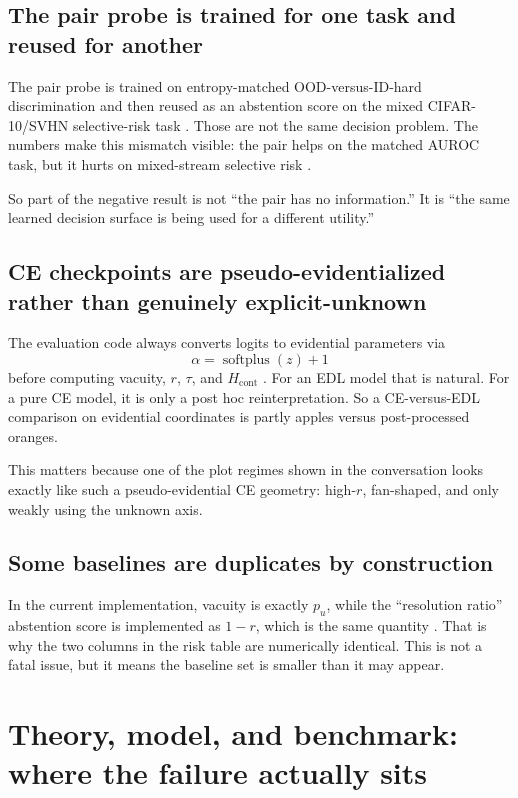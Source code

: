 \documentclass[11pt]{article}
\begin{document}
\subsection{The pair probe is trained for one task and reused for another}

The pair probe is trained on entropy-matched OOD-versus-ID-hard discrimination and then reused as an abstention score on the mixed CIFAR-10/SVHN selective-risk task \cite{eval}. Those are not the same decision problem. The numbers make this mismatch visible: the pair helps on the matched AUROC task, but it hurts on mixed-stream selective risk \cite{csv-auroc,csv-risk}.

So part of the negative result is not ``the pair has no information.'' It is ``the same learned decision surface is being used for a different utility.''

\subsection{CE checkpoints are pseudo-evidentialized rather than genuinely explicit-unknown}

The evaluation code always converts logits to evidential parameters via
\[
\alpha = \operatorname{softplus}(z)+1
\]
before computing vacuity, $r$, $\tau$, and $H_{\mathrm{cont}}$ \cite{eval}. For an EDL model that is natural. For a pure CE model, it is only a post hoc reinterpretation. So a CE-versus-EDL comparison on evidential coordinates is partly apples versus post-processed oranges.

This matters because one of the plot regimes shown in the conversation looks exactly like such a pseudo-evidential CE geometry: high-$r$, fan-shaped, and only weakly using the unknown axis.

\subsection{Some baselines are duplicates by construction}

In the current implementation, vacuity is exactly $p_u$, while the ``resolution ratio'' abstention score is implemented as $1-r$, which is the same quantity \cite{readme,utils,eval}. That is why the two columns in the risk table are numerically identical. This is not a fatal issue, but it means the baseline set is smaller than it may appear.

\section{Theory, model, and benchmark: where the failure actually sits}
\end{document}
